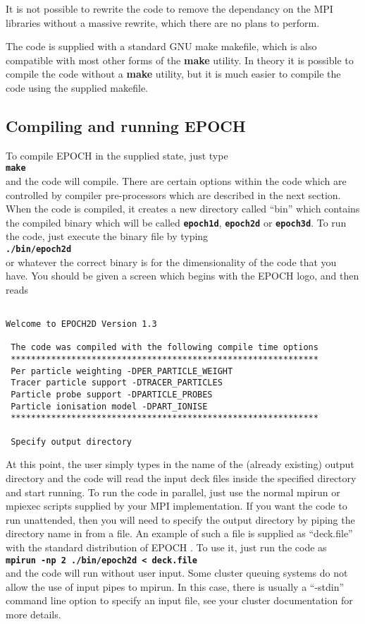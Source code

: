 \documentclass[12pt]{article}
\newcommand{\simpleboxverbatim}{\begin{Verbatim}[obeytabs=true,frame=single,
  framerule=0.5mm,rulecolor=\color{warwickmid}]}
\newcommand{\inlinecode}[1]{{\color{warwickred} \bf\texttt{#1}}}
\newcommand{\EPOCH}{{\color{warwickdark}\fontfamily{phv}\selectfont EPOCH} }
\begin{document}
It is not possible to rewrite the code to remove the dependancy on the MPI
libraries without a massive rewrite, which there are no plans to perform.

The code is supplied with a standard GNU make makefile, which is also
compatible with most other forms of the {\bf make} utility. In theory it is
possible to compile the code without a {\bf make} utility, but it is much
easier to compile the code using the supplied makefile.

\subsection{Compiling and running \EPOCH}

To compile \EPOCH in the supplied state, just type\\
\inlinecode{make}\\
and the code will compile. There are certain options within the code which are
controlled by compiler pre-processors which are described in the next
section. When the code is compiled, it creates a new directory called ``bin''
which contains the compiled binary which will be called \inlinecode{epoch1d},
\inlinecode{epoch2d} or \inlinecode{epoch3d}. To run the code, just execute the
binary file by typing\\
\inlinecode{./bin/epoch2d}\\
or whatever the correct binary is for the dimensionality of the code that you
have. You should be given a screen which begins with the \EPOCH logo, and then
reads\\

\simpleboxverbatim

Welcome to EPOCH2D Version 1.3

 The code was compiled with the following compile time options
 *************************************************************
 Per particle weighting -DPER_PARTICLE_WEIGHT
 Tracer particle support -DTRACER_PARTICLES
 Particle probe support -DPARTICLE_PROBES
 Particle ionisation model -DPART_IONISE
 *************************************************************

 Specify output directory

\end{Verbatim}

At this point, the user simply types in the name of the (already existing)
output directory and the code will read the input deck files inside the
specified directory and start running. To run the code in parallel, just use
the normal mpirun or mpiexec scripts supplied by your MPI implementation. If
you want the code to run unattended, then you will need to specify the output
directory by piping the directory name in from a file. An example of such a
file is supplied as ``deck.file'' with the standard distribution of \EPOCH. To
use it, just run the code as\\
\inlinecode{mpirun -np 2 ./bin/epoch2d < deck.file}\\
and the code will run without user input. Some cluster queuing systems do not
allow the use of input pipes to mpirun. In this case, there is usually a
``-stdin'' command line option to specify an input file, see your cluster
documentation for more details.
\end{document}
